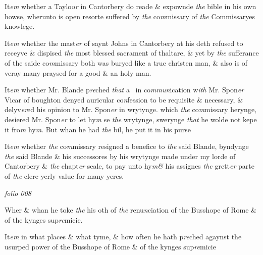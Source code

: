 \documentclass[12pt, a4paper]{book}
\begin{document}
		\ifthenelse{\isodd{\thepage}}
		{\reversemarginpar}
		{\normalmarginpar}
		 It\textit{em} whether a Taylo\textit{ur} in Cantorbery do reade \& expownde
 \textit{the} bible in his own howse, wherunto is open resorte
            			suffered by \textit{the} co\textit{m}missary of \textit{the} Commissaryes knowlege.
            		
		\ifthenelse{\isodd{\thepage}}
		{\reversemarginpar}
		{\normalmarginpar}
		It\textit{em} whether the mast\textit{er} of saynt Johns in Cantorbery at
 his deth refused to receyve \& dispised \textit{the} most blessed sacrament of thaltare, \& yet by \textit{the} sufferance of the saide co\textit{m}missary
 both was buryed like a true christen man, \& also is of veray
 many praysed for a good \& an holy man.

            		
		\ifthenelse{\isodd{\thepage}}
		{\reversemarginpar}
		{\normalmarginpar}
		It\textit{em} whether Mr. Blande p\textit{re}ched \textit{that} a  in co\textit{mmun}ication w\textit{ith} Mr.
            			Spon\textit{er} Vicar of boughton denyed auricular co\textit{n}fession to be
 requisite \& necessary, \& delyv\textit{er}ed his opinion to Mr. Spon\textit{er}
            			in wrytynge. which \textit{the} co\textit{m}missary herynge, desiered Mr. Spon\textit{er}
 to let hy\textit{m} se \textit{the} wrytynge, swerynge \textit{that} he wolde not kepe
 it fro\textit{m} hy\textit{m}. But whan he had \textit{the} bil, he put it in his
 purse

		\ifthenelse{\isodd{\thepage}}
		{\reversemarginpar}
		{\normalmarginpar}
		 It\textit{em} whether \textit{the} co\textit{m}missary resigned a benefice to \textit{the} said
	Blande, byndynge \textit{the} said Blande \& his successores by his wrytynge made under my lorde of Cantorbery \& \textit{the} chapt\textit{er} seale,
 to pay unto hy\textit{m\&} his assignes \textit{the} grett\textit{er} parte of \textit{the} clere yerly
 value for many yeres.

\dotfill
						\newpage
{}

\textit{folio 008}



		\ifthenelse{\isodd{\thepage}}
		{\reversemarginpar}
		{\normalmarginpar}
		Wher \& whan he toke \textit{the} his oth of \textit{the} renu\textit{n}ciation
 of the Busshope of Rome \& of the kynges sup\textit{re}micie.
 
		\ifthenelse{\isodd{\thepage}}
		{\reversemarginpar}
		{\normalmarginpar}
		It\textit{em} in what places \& what tyme, \& how often he hath
 p\textit{re}ched agaynst the usurped power of the Busshope of Rome
 \& of the kynges sup\textit{re}micie
 
\end{document}

